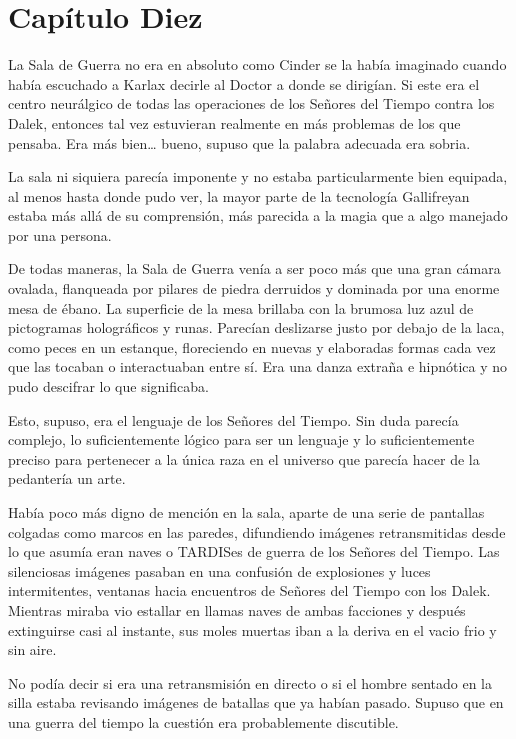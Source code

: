 \chapter*{Capítulo Diez}

La Sala de Guerra no era en absoluto como Cinder se la había imaginado cuando había escuchado a Karlax decirle al Doctor a donde se dirigían. Si este era el centro neurálgico de todas las operaciones de los Señores del Tiempo contra los Dalek, entonces tal vez estuvieran realmente en más problemas de los que pensaba. Era más bien… bueno, supuso que la palabra adecuada era sobria.

La sala ni siquiera parecía imponente y no estaba particularmente bien equipada, al menos hasta donde pudo ver, la mayor parte de la tecnología Gallifreyan estaba más allá de su comprensión, más parecida a la magia que a algo manejado por una persona.

De todas maneras, la Sala de Guerra venía a ser poco más que una gran cámara ovalada, flanqueada por pilares de piedra derruidos y dominada por una enorme mesa de ébano. La superficie de la mesa brillaba con la brumosa luz azul de pictogramas holográficos y runas. Parecían deslizarse justo por debajo de la laca, como peces en un estanque, floreciendo en nuevas y elaboradas formas cada vez que las tocaban o interactuaban entre sí. Era una danza extraña e hipnótica y no pudo descifrar lo que significaba.

Esto, supuso, era el lenguaje de los Señores del Tiempo. Sin duda parecía complejo, lo suficientemente lógico para ser un lenguaje y lo suficientemente preciso para pertenecer a la única raza en el universo que parecía hacer de la pedantería un arte.

Había poco más digno de mención en la sala, aparte de una serie de pantallas colgadas como marcos en las paredes, difundiendo imágenes retransmitidas desde lo que asumía eran naves o TARDISes de guerra de los Señores del Tiempo. Las silenciosas imágenes pasaban en una confusión de explosiones y luces intermitentes, ventanas hacia encuentros de Señores del Tiempo con los Dalek. Mientras miraba vio estallar en llamas naves de ambas facciones y después extinguirse casi al instante, sus moles muertas iban a la deriva en el vacio frio y sin aire. 

No podía decir si era una retransmisión en directo o si el hombre sentado en la silla estaba revisando imágenes de batallas que ya habían pasado. Supuso que en una guerra del tiempo la cuestión era probablemente discutible.

